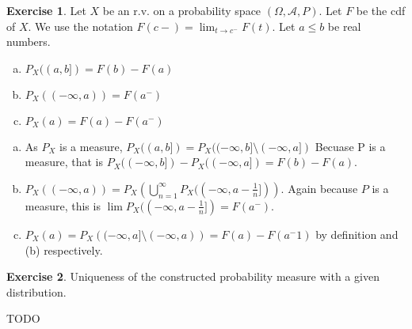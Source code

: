 \documentclass[11pt,oneside]{article}
\numberwithin{equation}{section}
\theoremstyle{definition}
\newtheorem{exercise}{Exercise}
\def\fancyA{\mathscr{A}}
\begin{document}
\begin{exercise}
  Let $X$ be an r.v. on a probability space $(\Omega, \fancyA, P)$.  Let $F$ be the cdf of $X$.  We use the notation
  $F(c-) = \lim _ {t \to c^-}F(t)$. Let $a \leq b$ be real numbers.  
  \begin{enumerate}[(a)]
  \item
    $P_X((a, b]) = F(b) - F(a)$
  \item
    $P_X((-\infty, a)) = F(a^-)$
  \item
    $P_X({a}) = F(a) - F(a^-)$
  \end{enumerate}
\end{exercise}

\begin{solution}
\begin{enumerate}[(a)]
\item
  As $P_X$ is a measure, $P_X((a, b]) = P_X((-\infty, b] \setminus (-\infty, a])$ Becuase P is a measure,
  that is $P_X((-\infty, b]) -  P_X((-\infty, a]) = F(b) - F(a)$.
          
\item
  $P_X (( - \infty, a)) = P_X \left( \bigcup \limits _{n = 1} ^{\infty} P_X ((- \infty, a - \frac{1}{n}]) \right)$.
  Again because $P$ is a measure, this is $\lim P_X((-\infty, a - \frac{1}{n}]) = F(a^-)$. 
\item
  $P_X ({a}) = P_X \left( (-\infty, a] \setminus (-\infty, a) \right) = F(a) - F(a^-1)$ by definition and (b) respectively. 
\end{enumerate}
\end{solution}

\begin{exercise}
  Uniqueness of the constructed probability measure with a given distribution.  
\end{exercise}
\begin{solution}
TODO
\end{solution}


\begin{comment}
\begin{exercise}
  problem
\end{exercise}
\begin{solution}
\begin{enumerate}[(a)]
\item
  first answer
\end{enumerate}
\end{solution}
\end{comment}
\end{document}
